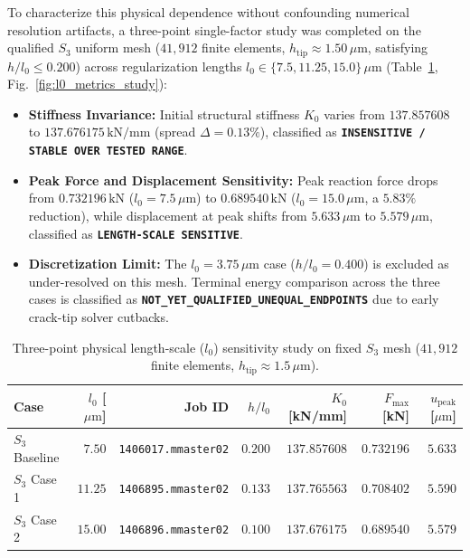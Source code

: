 To characterize this physical dependence without confounding numerical resolution artifacts, a three-point single-factor study was completed on the qualified $S_3$ uniform mesh ($41{,}912$ finite elements, $h_{\mathrm{tip}} \approx 1.50\,\mu\mathrm{m}$, satisfying $h/l_0 \le 0.200$) across regularization lengths $l_0 \in \{7.5, 11.25, 15.0\}\,\mu\mathrm{m}$ (Table~\ref{tab:l0_sensitivity_matrix}, Fig.~\ref{fig:l0_metrics_study}):
\begin{itemize}
  \item \textbf{Stiffness Invariance:} Initial structural stiffness $K_0$ varies from $137.857608$ to $137.676175\,\mathrm{kN/mm}$ (spread $\Delta = 0.13\%$), classified as \textbf{\texttt{INSENSITIVE / STABLE OVER TESTED RANGE}}.
  \item \textbf{Peak Force and Displacement Sensitivity:} Peak reaction force drops from $0.732196\,\mathrm{kN}$ ($l_0 = 7.5\,\mu\mathrm{m}$) to $0.689540\,\mathrm{kN}$ ($l_0 = 15.0\,\mu\mathrm{m}$, a $5.83\%$ reduction), while displacement at peak shifts from $5.633\,\mu\mathrm{m}$ to $5.579\,\mu\mathrm{m}$, classified as \textbf{\texttt{LENGTH-SCALE SENSITIVE}}.
  \item \textbf{Discretization Limit:} The $l_0 = 3.75\,\mu\mathrm{m}$ case ($h/l_0 = 0.400$) is excluded as under-resolved on this mesh. Terminal energy comparison across the three cases is classified as \textbf{\texttt{NOT\_YET\_QUALIFIED\_UNEQUAL\_ENDPOINTS}} due to early crack-tip solver cutbacks.
\end{itemize}

\begin{table}[htbp]
\centering
\caption{Three-point physical length-scale ($l_0$) sensitivity study on fixed $S_3$ mesh ($41{,}912$ finite elements, $h_{\mathrm{tip}} \approx 1.5\,\mu\mathrm{m}$).}
\label{tab:l0_sensitivity_matrix}
\small
\begin{tabularx}{\textwidth}{lrrrrrr}
\toprule
Case & $l_0$ [$\mu\mathrm{m}$] & Job ID & $h/l_0$ & $K_0$ [kN/mm] & $F_{\max}$ [kN] & $u_{\mathrm{peak}}$ [$\mu\mathrm{m}$] \\
\midrule
$S_3$ Baseline & $7.50$ & \texttt{1406017.mmaster02} & $0.200$ & $137.857608$ & $0.732196$ & $5.633$ \\
$S_3$ Case 1 & $11.25$ & \texttt{1406895.mmaster02} & $0.133$ & $137.765563$ & $0.708402$ & $5.590$ \\
$S_3$ Case 2 & $15.00$ & \texttt{1406896.mmaster02} & $0.100$ & $137.676175$ & $0.689540$ & $5.579$ \\
\bottomrule
\end{tabularx}
\end{table}

